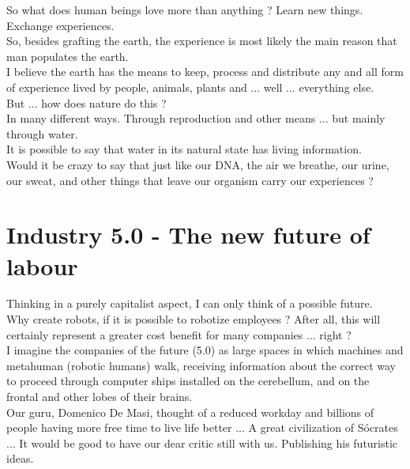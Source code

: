 \documentclass[11pt]{book}
\begin{document}
\noindent So what does human beings love more than anything ? Learn new things. Exchange experiences. \\

\noindent So, besides grafting the earth, the experience is most likely the main reason that man populates the earth. \\

\noindent I believe the earth has the means to keep, process and distribute any and all form of experience lived by people, animals, plants and ... well ... everything else. \\

\noindent But ... how does nature do this ? \\

\noindent In many different ways. Through reproduction and other means ... but mainly through water. \\

\noindent It is possible to say that water in its natural state has living information. \\

\noindent Would it be crazy to say that just like our DNA, the air we breathe, our urine, our sweat, and other things that leave our organism carry our experiences ?

\chapter{Industry 5.0 - The new future of labour}

\noindent Thinking in a purely capitalist aspect, I can only think of a possible future. \\

\noindent Why create robots, if it is possible to robotize employees ? After all, this will certainly represent a greater cost benefit for many companies ... right ? \\

\noindent I imagine the companies of the future (5.0) as large spaces in which machines and metahuman (robotic humans) walk, receiving information about the correct way to proceed through computer ships installed on the cerebellum, and on the frontal and other lobes of their brains. \\

\noindent Our guru, Domenico De Masi, thought of a reduced workday and billions of people having more free time to live life better ... A great civilization of Sócrates ... It would be good to have our dear critic still with us. Publishing his futuristic ideas. \\
\end{document}
